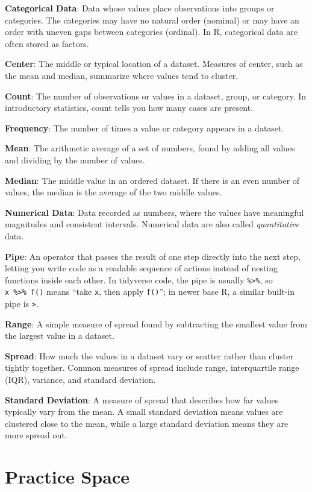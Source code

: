 \documentclass[
]{article}
\begin{document}
\textbf{Categorical Data}: Data whose values place observations into
groups or categories. The categories may have no natural order (nominal)
or may have an order with uneven gaps between categories (ordinal). In
R, categorical data are often stored as factors.

\textbf{Center}: The middle or typical location of a dataset. Measures
of center, such as the mean and median, summarize where values tend to
cluster.

\textbf{Count}: The number of observations or values in a dataset,
group, or category. In introductory statistics, count tells you how many
cases are present.

\textbf{Frequency}: The number of times a value or category appears in a
dataset.

\textbf{Mean}: The arithmetic average of a set of numbers, found by
adding all values and dividing by the number of values.

\textbf{Median}: The middle value in an ordered dataset. If there is an
even number of values, the median is the average of the two middle
values.

\textbf{Numerical Data}: Data recorded as numbers, where the values have
meaningful magnitudes and consistent intervals. Numerical data are also
called \emph{quantitative} data.

\textbf{Pipe}: An operator that passes the result of one step directly
into the next step, letting you write code as a readable sequence of
actions instead of nesting functions inside each other. In tidyverse
code, the pipe is usually \texttt{\%\textgreater{}\%}, so
\texttt{x\ \%\textgreater{}\%\ f()} means ``take \texttt{x}, then apply
\texttt{f()}''; in newer base R, a similar built-in pipe is
\texttt{\textbar{}\textgreater{}}.

\textbf{Range}: A simple measure of spread found by subtracting the
smallest value from the largest value in a dataset.

\textbf{Spread}: How much the values in a dataset vary or scatter rather
than cluster tightly together. Common measures of spread include range,
interquartile range (IQR), variance, and standard deviation.

\textbf{Standard Deviation}: A measure of spread that describes how far
values typically vary from the mean. A small standard deviation means
values are clustered close to the mean, while a large standard deviation
means they are more spread out.

\section{\texorpdfstring{ Practice
Space}{ Practice Space}}\label{practice-space}
\end{document}
